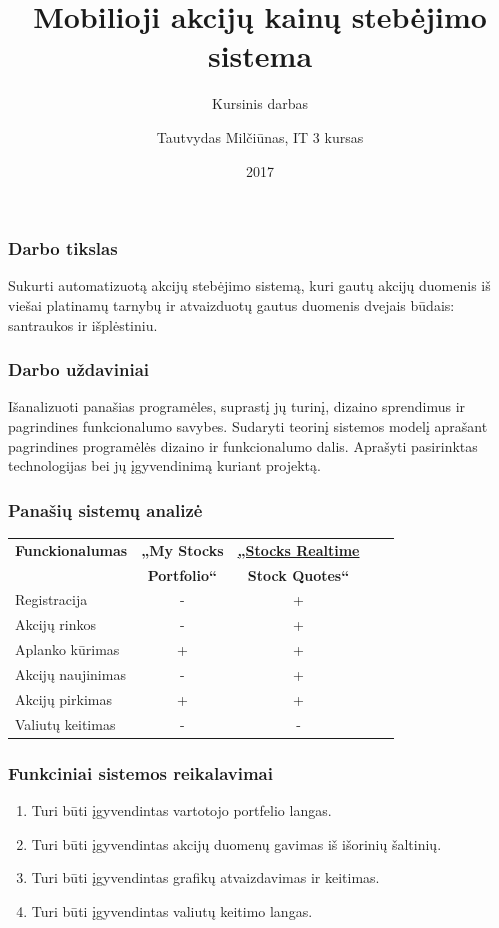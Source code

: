 \documentclass[hyperref={breaklinks=true},fleqn,mathserif]{beamer}
\title[Mobilioji akcijų kainų stebėjimo sistema]{Mobilioji akcijų kainų stebėjimo sistema}
\subtitle{Kursinis darbas}
\author{Tautvydas Milčiūnas, IT 3 kursas}
\institute{Vilniaus Universitetas, Lietuva \\
	\smallskip Matematikos ir informatikos fakultetas \\
	\smallskip Kompiuterijos katedra
}
\date{{\scriptsize 2017}}
\begin{document}
	\frame[plain]{\titlepage}
	
	\begin{frame}
		\frametitle{Darbo tikslas}
		Sukurti automatizuotą akcijų stebėjimo sistemą, kuri gautų akcijų duomenis iš viešai platinamų tarnybų ir atvaizduotų gautus duomenis dvejais būdais: santraukos ir išplėstiniu.
	\end{frame}
	\begin{frame}
		\frametitle{Darbo uždaviniai}
		Išanalizuoti panašias programėles, suprastį jų turinį, dizaino sprendimus ir pagrindines funkcionalumo savybes. Sudaryti teorinį sistemos modelį aprašant pagrindines programėlės dizaino ir funkcionalumo dalis. Aprašyti pasirinktas technologijas bei jų įgyvendinimą kuriant projektą.
	\end{frame}
	\begin{frame}
		\frametitle{Panašių sistemų analizė}
		\begin{table}\centering
			\begin{tabular}{|l|c|c|ll}
				\cline{1-3}
				\textbf{Funckionalumas} & \textbf{„My Stocks} & \textbf{\href{https://play.google.com/store/apps/details?id=org.dayup.stocks}{„Stocks Realtime}} &  \\
				& \textbf{ Portfolio“}&\textbf{Stock Quotes“}  \\ \cline{1-3}
				Registracija&-&+& \\ \cline{1-3}
				Akcijų rinkos&-&+& \\ \cline{1-3}
				Aplanko kūrimas&+&+& \\ \cline{1-3}
				Akcijų naujinimas&-&+& \\ \cline{1-3}
				Akcijų pirkimas&+&+& \\ \cline{1-3}
				Valiutų keitimas&-&-& \\ \cline{1-3}
			\end{tabular}
		\end{table}
	\end{frame}
	\begin{frame}
		\frametitle{Funkciniai sistemos reikalavimai}
		\begin{enumerate}
			\item Turi būti įgyvendintas vartotojo portfelio langas.
			\item Turi būti įgyvendintas akcijų duomenų gavimas iš išorinių šaltinių.
			\item Turi būti įgyvendintas grafikų atvaizdavimas ir keitimas.
			\item Turi būti įgyvendintas valiutų keitimo langas.
		\end{enumerate}
	\end{frame}
\end{document}
